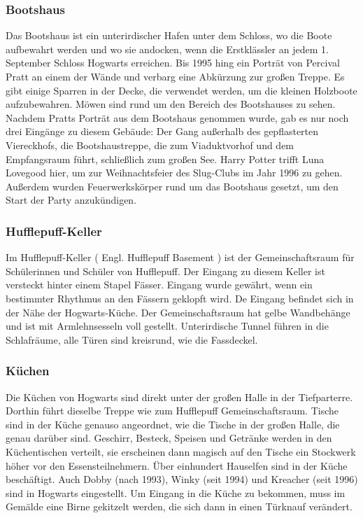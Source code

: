 \documentclass[a4paper, 10pt]{article}
\begin{document}
\subsubsection*{\large Bootshaus}
Das Bootshaus ist ein unterirdischer Hafen unter dem Schloss, wo die Boote aufbewahrt werden und wo sie andocken, wenn die Erstklässler an jedem 1. September Schloss Hogwarts erreichen. Bis 1995 hing ein Porträt von Percival Pratt an einem der Wände und verbarg eine Abkürzung zur großen Treppe. Es gibt einige Sparren in der Decke, die verwendet werden, um die kleinen Holzboote aufzubewahren. Möwen sind rund um den Bereich des Bootshauses zu sehen.
\vspace{10pt}
\newline
{}  
Nachdem Pratts Porträt aus dem Bootshaus genommen wurde, gab es nur noch drei Eingänge zu diesem Gebäude: Der Gang außerhalb des gepflasterten Viereckhofs, die Bootshaustreppe, die zum Viaduktvorhof und dem Empfangsraum führt, schließlich zum großen See. Harry Potter trifft Luna Lovegood hier, um zur Weihnachtsfeier des Slug-Clubs im Jahr 1996 zu gehen. Außerdem wurden Feuerwerkskörper rund um das Bootshaus gesetzt, um den Start der Party anzukündigen.
\subsubsection*{\large Hufflepuff-Keller}
Im Hufflepuff-Keller (  Engl.  Hufflepuff Basement ) ist der Gemeinschaftsraum für Schülerinnen und Schüler von Hufflepuff. Der Eingang zu diesem Keller ist versteckt hinter einem Stapel Fässer. Eingang wurde gewährt, wenn ein bestimmter Rhythmus an den Fässern geklopft wird. De Eingang befindet sich in der Nähe der Hogwarts-Küche. Der Gemeinschaftsraum hat gelbe Wandbehänge und ist mit Armlehnsesseln voll gestellt. Unterirdische Tunnel führen in die Schlafräume, alle Türen sind kreisrund, wie die Fassdeckel.
\subsubsection*{\large Küchen}
Die Küchen von Hogwarts sind direkt unter der großen Halle in der Tiefparterre. Dorthin führt dieselbe Treppe wie zum Hufflepuff Gemeinschaftsraum. Tische sind in der Küche genauso angeordnet, wie die Tische in der großen Halle, die genau darüber sind. Geschirr, Besteck, Speisen und Getränke werden in den Küchentischen verteilt, sie erscheinen dann magisch auf den Tische ein Stockwerk höher vor den Essensteilnehmern. Über einhundert Hauselfen sind in der Küche beschäftigt. Auch Dobby (nach 1993), Winky (seit 1994) und Kreacher (seit 1996) sind in Hogwarts eingestellt.
\vspace{10pt}
\newline
{}  
Um Eingang in die Küche zu bekommen, muss im Gemälde eine Birne gekitzelt werden, die sich dann in einen Türknauf verändert.
\end{document}
